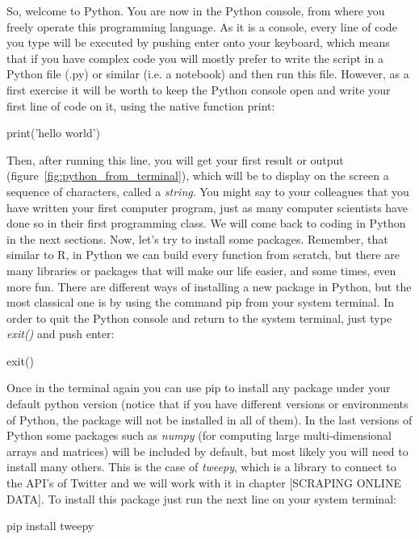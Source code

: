 So, welcome to Python. You are now in the Python console, from where you freely operate this programming language. As it is a console, every line of code you type will be executed by pushing enter onto your keyboard, which means that if you have complex code you will mostly prefer to write the script in a Python file (.py) or similar (i.e. a notebook) and then run this file. However, as a first exercise it will be worth to keep the Python console open and write your first line of code on it, using the native function print:

\begin{examplepy}
print('hello world')
\end{examplepy}

Then, after running this line, you will get your first result or output (figure~\ref{fig:python_from_terminal}), which will be to display on the screen a sequence of characters, called a \textit{string}. You might say to your colleagues that you have written your first computer program, just as many computer scientists have done so in their first programming class. We will come back to coding in Python in the next sections. Now, let’s try to install some packages. Remember, that similar to R, in Python we can build every function from scratch, but there are many libraries or packages that will make our life easier, and some times, even more fun. There are different ways of installing a new package in Python, but the most classical one is by using the command pip from your system terminal. In order to quit the Python console and return to the system terminal, just type \textit{exit()} and push enter:

\begin{terminal}
exit()
\end{terminal}

Once in the terminal again you can use pip to install any package under your default python version (notice that if you have different versions or environments of Python, the package will not be installed in all of them).  In the last versions of Python some packages such as \textit{numpy} (for computing large multi-dimensional arrays and matrices) will be included  by default, but most likely you will need to install many others.  This is the case of \textit{tweepy}, which is a library to connect to the API's of Twitter and we will work with it in chapter [SCRAPING ONLINE DATA]. To install this package just run the next line on your system terminal:

\begin{terminal}
pip install tweepy
\end{terminal}

